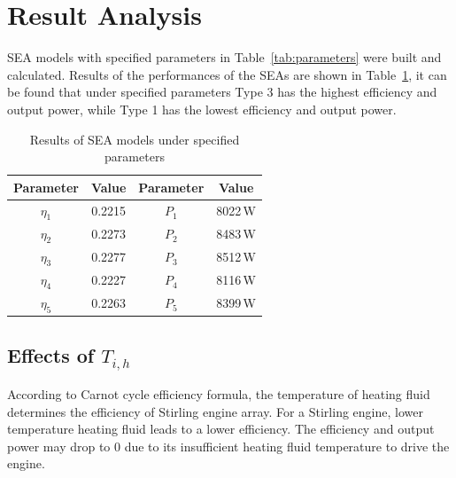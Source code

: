 \documentclass[review,3p,10t]{elsarticle}
\begin{document}
\section{Result Analysis}

SEA models with specified parameters in Table~\ref{tab:parameters} were built and calculated. Results of the performances of the SEAs are shown in Table~\ref{tab:result}, it can be found that under specified parameters Type 3 has the highest efficiency and output power, while Type 1 has the lowest efficiency and output power.

\begin{table}[htbp]
	\caption{Results of SEA models under specified parameters}
	\begin{center}
	\begin{tabular}{cccc}
		\toprule
		Parameter		&	Value	&	Parameter		&	Value\\
		\midrule
		$\eta_1$	&	0.2215	&	$P_1$		&	8022\,W\\
		$\eta_2$	&	0.2273	&	$P_2$		&	8483\,W\\
		$\eta_3$	&	0.2277	&	$P_3$		&	8512\,W\\
		$\eta_4$	&	0.2227	&	$P_4$		&	8116\,W\\
		$\eta_5$	&	0.2263	&	$P_5$		&	8399\,W\\		
		\bottomrule
	\end{tabular}
	\end{center}
	\label{tab:result}
\end{table}

\subsection{Effects of $T_{i,h}$}
According to Carnot cycle efficiency formula, the temperature of heating fluid determines the efficiency of Stirling engine array. For a Stirling engine, lower temperature heating fluid leads to a lower efficiency. The efficiency and output power may drop to 0 due to its insufficient heating fluid temperature to drive the engine.
\end{document}
